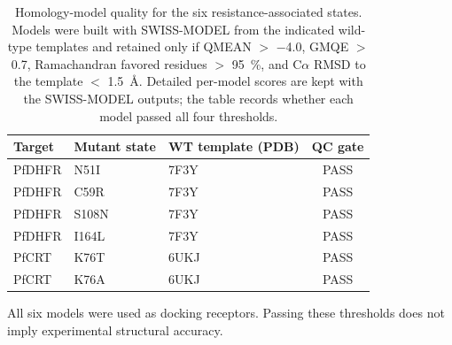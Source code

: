\begin{table}[htbp]
\centering
\caption{Homology-model quality for the six resistance-associated states. Models were built with SWISS-MODEL from the indicated wild-type templates and retained only if QMEAN $>$ \num{-4.0}, GMQE $>$ \num{0.7}, Ramachandran favored residues $>$ \qty{95}{\percent}, and C$\alpha$ RMSD to the template $<$ \qty{1.5}{\angstrom}. Detailed per-model scores are kept with the SWISS-MODEL outputs; the table records whether each model passed all four thresholds.}
\label{tab:s_homology_qc}
\small
\begin{tabularx}{\textwidth}{l l l c}
\toprule
Target & Mutant state & WT template (PDB) & QC gate \\
\midrule
PfDHFR & N51I & 7F3Y & PASS \\
PfDHFR & C59R & 7F3Y & PASS \\
PfDHFR & S108N & 7F3Y & PASS \\
PfDHFR & I164L & 7F3Y & PASS \\
PfCRT & K76T & 6UKJ & PASS \\
PfCRT & K76A & 6UKJ & PASS \\
\bottomrule
\end{tabularx}

\vspace{0.3em}
\noindent\footnotesize All six models were used as docking receptors. Passing these thresholds does not imply experimental structural accuracy.
\end{table}
